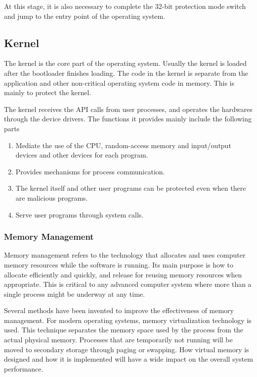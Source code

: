 \documentclass{swfcthesis}
\begin{document}
At this stage, it is also necessary to complete the 32-bit protection mode switch and jump
to the entry point of the operating system.

\subsection{Kernel}
\label{sec:kernel}

The kernel is the core part of the operating system. Usually the kernel is loaded after
the bootloader finishes loading. The code in the kernel is separate from the application
and other non-critical operating system code in memory. This is mainly to protect the
kernel.

The kernel receives the API calls from user processes, and operates the hardwares through
the device drivers. The functions it provides mainly include the following parts
\begin{enumerate}
\item Mediate the use of the CPU, random-access memory and input/output devices and other
  devices for each program.
\item Provides mechanisms for process communication.
\item The kernel itself and other user programs can be protected even when there are
  malicious programs.
\item Serve user programs through system calls.
\end{enumerate}


\subsubsection{Memory Management}
\label{sec:memory-management-1}

Memory management refers to the technology that allocates and uses computer memory
resources while the software is running. Its main purpose is how to allocate efficiently
and quickly, and release for reusing memory resources when appropriate. This is critical
to any advanced computer system where more than a single process might be underway at any
time.

Several methods have been invented to improve the effectiveness of memory management. For
modern operating systems, memory virtualization technology is used. This technique
separates the memory space used by the process from the actual physical memory. Processes
that are temporarily not running will be moved to secondary storage through paging or
swapping. How virtual memory is designed and how it is implemented will have a wide impact
on the overall system performance.
\end{document}

